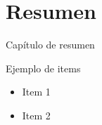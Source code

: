 \setcounter{page}{1}
\chapter*{Resumen}
Capítulo de resumen

Ejemplo de items
\begin{itemize}
\item Item 1
\item Item 2
\end{itemize}